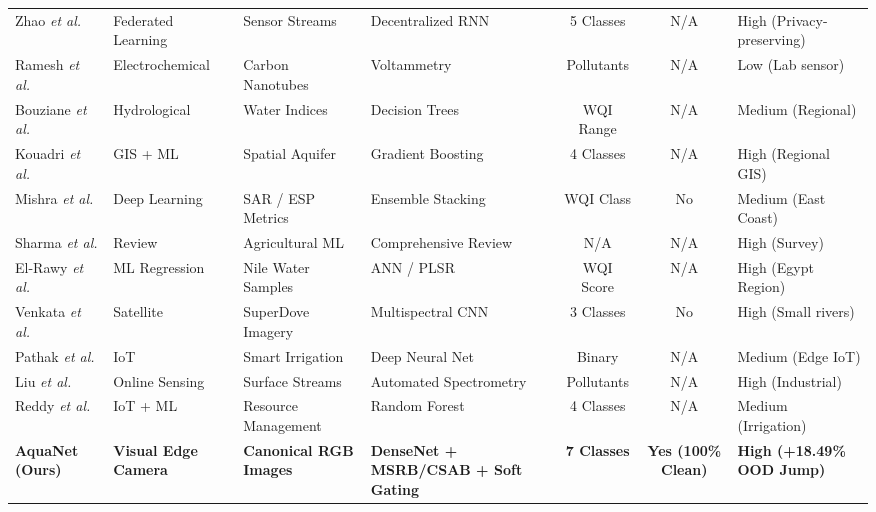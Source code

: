 \documentclass[journal]{IEEEtran}
\newcommand{\method}{AquaNet}
\begin{document}
\begin{table}[!t]
\begin{tabularx}{\linewidth}{l p{2.2cm} p{2.5cm} p{3.8cm} c c p{2.2cm}}
Zhao \emph{et al.} \cite{decentralized_fl_water_2024} & Federated Learning & Sensor Streams & Decentralized RNN & 5 Classes & N/A & High (Privacy-preserving) \\
Ramesh \emph{et al.} \cite{cnt_sensor_water_2023} & Electrochemical & Carbon Nanotubes & Voltammetry & Pollutants & N/A & Low (Lab sensor) \\
Bouziane \emph{et al.} \cite{wqi_semiarid_2024} & Hydrological & Water Indices & Decision Trees & WQI Range & N/A & Medium (Regional) \\
Kouadri \emph{et al.} \cite{gis_ml_coastal_2023} & GIS + ML & Spatial Aquifer & Gradient Boosting & 4 Classes & N/A & High (Regional GIS) \\
Mishra \emph{et al.} \cite{irrigation_prognostication_2024} & Deep Learning & SAR / ESP Metrics & Ensemble Stacking & WQI Class & No & Medium (East Coast) \\
Sharma \emph{et al.} \cite{ml_agriculture_review_2023} & Review & Agricultural ML & Comprehensive Review & N/A & N/A & High (Survey) \\
El-Rawy \emph{et al.} \cite{wqi_nile_egypt_2024} & ML Regression & Nile Water Samples & ANN / PLSR & WQI Score & N/A & High (Egypt Region) \\
Venkata \emph{et al.} \cite{superdove_water_2023} & Satellite & SuperDove Imagery & Multispectral CNN & 3 Classes & No & High (Small rivers) \\
Pathak \emph{et al.} \cite{towards_precision_agri_2024} & IoT & Smart Irrigation & Deep Neural Net & Binary & N/A & Medium (Edge IoT) \\
Liu \emph{et al.} \cite{online_water_monitoring_2023} & Online Sensing & Surface Streams & Automated Spectrometry & Pollutants & N/A & High (Industrial) \\
Reddy \emph{et al.} \cite{iot_ml_irrigation_2024} & IoT + ML & Resource Management & Random Forest & 4 Classes & N/A & Medium (Irrigation) \\
\textbf{\method{} (Ours)} & \textbf{Visual Edge Camera} & \textbf{Canonical RGB Images} & \textbf{DenseNet + MSRB/CSAB + Soft Gating} & \textbf{7 Classes} & \textbf{Yes (100\% Clean)} & \textbf{High (+18.49\% OOD Jump)} \\
\bottomrule
\end{tabularx}
\end{table}
\end{document}
